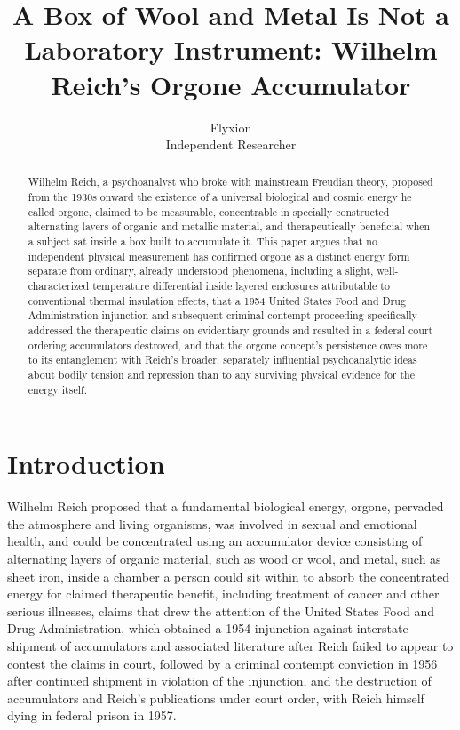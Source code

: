 \documentclass[11pt]{article}
\title{A Box of Wool and Metal Is Not a Laboratory Instrument: Wilhelm Reich's Orgone Accumulator}
\author{Flyxion \\ \small Independent Researcher}
\date{}
\begin{document}
\maketitle

\begin{abstract}
Wilhelm Reich, a psychoanalyst who broke with mainstream Freudian theory, proposed from the 1930s onward the existence of a universal biological and cosmic energy he called orgone, claimed to be measurable, concentrable in specially constructed alternating layers of organic and metallic material, and therapeutically beneficial when a subject sat inside a box built to accumulate it. This paper argues that no independent physical measurement has confirmed orgone as a distinct energy form separate from ordinary, already understood phenomena, including a slight, well-characterized temperature differential inside layered enclosures attributable to conventional thermal insulation effects, that a 1954 United States Food and Drug Administration injunction and subsequent criminal contempt proceeding specifically addressed the therapeutic claims on evidentiary grounds and resulted in a federal court ordering accumulators destroyed, and that the orgone concept's persistence owes more to its entanglement with Reich's broader, separately influential psychoanalytic ideas about bodily tension and repression than to any surviving physical evidence for the energy itself.
\end{abstract}

\section{Introduction}

Wilhelm Reich proposed that a fundamental biological energy, orgone, pervaded the atmosphere and living organisms, was involved in sexual and emotional health, and could be concentrated using an accumulator device consisting of alternating layers of organic material, such as wood or wool, and metal, such as sheet iron, inside a chamber a person could sit within to absorb the concentrated energy for claimed therapeutic benefit, including treatment of cancer and other serious illnesses, claims that drew the attention of the United States Food and Drug Administration, which obtained a 1954 injunction against interstate shipment of accumulators and associated literature after Reich failed to appear to contest the claims in court, followed by a criminal contempt conviction in 1956 after continued shipment in violation of the injunction, and the destruction of accumulators and Reich's publications under court order, with Reich himself dying in federal prison in 1957.
\end{document}
